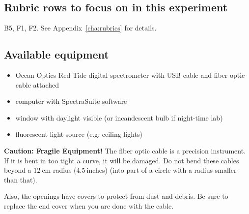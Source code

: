 \subsection{Rubric rows to focus on in this experiment}

B5, F1, F2.  See Appendix~\ref{cha:rubrics} for details.

\subsection{Available equipment}

\begin{itemize}
	\item Ocean Optics Red Tide digital spectrometer with USB cable and fiber optic cable attached
	
	\item computer with SpectraSuite software
	
	\item window with daylight visible (or incandescent bulb if night-time lab)
	
	\item fluorescent light source (e.g. ceiling lights)
\end{itemize}


\begin{framed}
	\textbf{Caution: Fragile Equipment!} The fiber optic cable is a precision instrument. If it is bent in too tight a curve, it will be damaged. Do not bend these cables beyond a $12\:$cm radius ($4.5\:$inches) (into part of a circle with a radius smaller than that).
	
	Also, the openings have covers to protect from dust and debris. Be sure to replace the end cover when you are done with the cable.
\end{framed}

